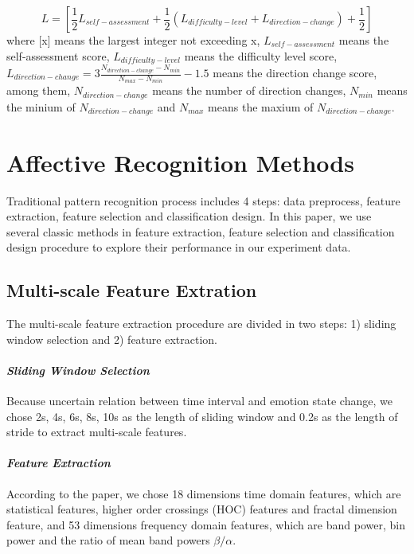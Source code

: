 \documentclass[runningheads,a4paper]{llncs}
\begin{document}
\begin{equation}
  L = [\frac{1}{2}L_{self-assessment} + \frac{1}{2}(L_{difficulty-level} +
      L_{direction-change}) + \frac{1}{2}]
\end{equation}
where [x] means the largest integer not exceeding x,
$L_{self-assessment}$ means the self-assessment score, $L_{difficulty-level}$
 means the difficulty level score, $L_{direction-change} = 3\frac{N_{direction-change} - N_{min}}
{N_{max} - N_{min}} - 1.5$ means the direction change score, among them,
$N_{direction-change}$ means the number of direction changes,
$N_{min}$ means the minium of $N_{direction-change}$ and
$N_{max}$ means the maxium of $N_{direction-change}$.

\section{Affective Recognition Methods}
Traditional pattern recognition process includes 4 steps: data preprocess,
feature extraction, feature selection and classification design. In this paper,
we use several classic methods in feature extraction, feature selection
and classification design procedure to explore their performance in
our experiment data.

\subsection{Multi-scale Feature Extration}
The multi-scale feature extraction procedure are divided in two steps:
1) sliding window selection and
2) feature extraction.

\paragraph{\textbf{\emph{Sliding Window Selection}}}

Because uncertain relation between time interval and emotion state change,
we chose 2s, 4s, 6s, 8s, 10s as the length of sliding window and 0.2s
as the length of stride to extract multi-scale features.

\paragraph{\textbf{\emph{Feature Extraction}}}
According to the paper\cite{Feature}, we chose 18 dimensions time domain features,
which are statistical features,
higher order crossings (HOC) features and fractal dimension feature, and 53
dimensions frequency domain features, which are band power, bin power and
the ratio of mean band powers $\beta/\alpha$.
\end{document}
